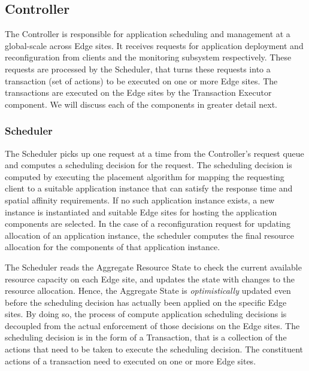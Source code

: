 \subsection{Controller}
The Controller is responsible for application scheduling and management at a global-scale across Edge sites. It receives requests for application deployment and reconfiguration from clients and the monitoring subsystem respectively. These requests are processed by the Scheduler, that turns these requests into a transaction (set of actions) to be executed on one or more Edge sites. The transactions are executed on the Edge sites by the Transaction Executor component. We will discuss each of the components in greater detail next.
\subsubsection{Scheduler}
\label{sec:scheduler}
The Scheduler picks up one request at a time from the Controller's request queue and computes a scheduling decision for the request. The scheduling decision is computed by executing the placement algorithm for mapping the requesting client to a suitable application instance that can satisfy the response time and spatial affinity requirements. If no such application instance exists, a new instance is instantiated and suitable Edge sites for hosting the application components are selected. In the case of a reconfiguration request for updating allocation of an application instance, the scheduler computes the final resource allocation for the components of that application instance.
\par The Scheduler reads the Aggregate Resource State to check the current available resource capacity on each Edge site, and updates the state with changes to the resource allocation. Hence, the Aggregate State is \textit{optimistically} updated even before the scheduling decision has actually been applied on the specific Edge sites. By doing so, the process of compute application scheduling decisions is decoupled from the actual enforcement of those decisions on the Edge sites. The scheduling decision is in the form of a Transaction, that is a collection of the actions that need to be taken to execute the scheduling decision. The constituent actions of a transaction need to executed on one or more Edge sites. 

